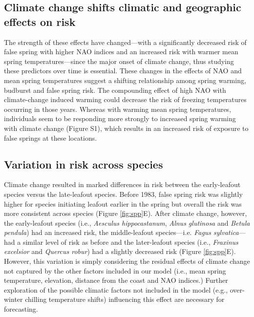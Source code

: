 \documentclass{article}\usepackage[]{graphicx}\usepackage[]{color}
\begin{document}
\subsection*{Climate change shifts climatic and geographic effects on risk}
The strength of these effects have changed---with a significantly decreased risk of false spring with higher NAO indices and an increased risk with warmer mean spring temperatures---since the major onset of climate change, thus studying these predictors over time is essential. These changes in the effects of NAO and mean spring temperatures suggest a shifting relationship among spring warming, budburst and false spring risk. The compounding effect of high NAO with climate-change induced warming could decrease the risk of freezing temperatures occurring in those years. Whereas with warming mean spring temperatures, individuals seem to be responding more strongly to increased spring warming with climate change (Figure S1), which results in an increased risk of exposure to false springs at these locations. 

\subsection*{Variation in risk across species} %
Climate change resulted in marked differences in risk between the early-leafout species versus the late-leafout species. Before 1983, false spring risk was slightly higher for species initiating leafout earlier in the spring but overall the risk was more consistent across species (Figure \ref{fig:spp}E). After climate change, however, the early-leafout species (i.e., \textit{Aesculus hippocastanum}, \textit{Alnus glutinosa} and \textit{Betula pendula}) had an increased risk, the middle-leafout species---i.e. \textit{Fagus sylvatica}---had a similar level of risk as before and the later-leafout species (i.e., \textit{Fraxinus excelsior} and \textit{Quercus robur}) had a slightly decreased risk (Figure \ref{fig:spp}E). However, this variation is simply considering the residual effects of climate change not captured by the other factors included in our model (i.e., mean spring temperature, elevation, distance from the coast and NAO indices.) Further exploration of the possible climatic factors not included in the model (e.g., over-winter chilling temperature shifts) influencing this effect are necessary for forecasting. 
\end{document}
